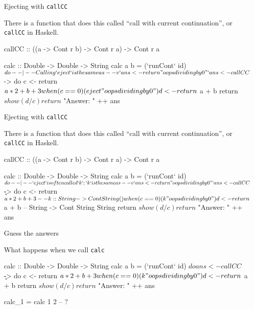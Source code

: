 \documentclass[ignorenonframetext,]{beamer}
\begin{document}
\begin{frame}[fragile]{Ejecting with \texttt{callCC}}

There is a function that does this called ``call with current
continuation'', or \texttt{callCC} in Haskell.

\begin{haskellcode}
callCC :: ((a -> Cont r b) -> Cont r a) -> Cont r a

calc :: Double -> Double -> String
calc a b = (`runCont` id) $ do

  --  |-- Calling `eject` is the same as
  --  v   `ans <- return "oops dividing by 0"`
  ans <- callCC $ \eject -> do
           c <- return $ a*2 + b + 3
           when (c == 0) (eject "oops dividing by 0")
           d <- return $ a + b
           return $ show (d / c)

  return $ "Answer: " ++ ans
\end{haskellcode}

\end{frame}

\begin{frame}[fragile]{Ejecting with \texttt{callCC}}

There is a function that does this called ``call with current
continuation'', or \texttt{callCC} in Haskell.

\begin{haskellcode}
callCC :: ((a -> Cont r b) -> Cont r a) -> Cont r a
\end{haskellcode}

\begin{haskellcode}
calc :: Double -> Double -> String
calc a b = (`runCont` id) $ do

  --  |-- `eject` is often called `k`; `k` is the same as
  --  v   `ans <- return "oops dividing by 0"`
  ans <- callCC $ \k -> do
           c <- return $ a*2 + b + 3
           --             k :: String -> Cont String ()
           when (c == 0) (k "oops dividing by 0")
           d <- return $ a + b
           -- String -> Cont String String
           return $ show (d / c)

  return $ "Answer: " ++ ans
\end{haskellcode}

\end{frame}

\begin{frame}[fragile]{Guess the answers}

What happens when we call \texttt{calc}

\begin{haskellcode}
calc :: Double -> Double -> String
calc a b = (`runCont` id) $ do

  ans <- callCC $ \k -> do
           c <- return $ a*2 + b + 3
           when (c == 0) (k "oops dividing by 0")
           d <- return $ a + b
           return $ show (d / c)

  return $ "Answer: " ++ ans
\end{haskellcode}

\begin{haskellcode}
calc_1 = calc 1 2    -- ?
\end{haskellcode}

\end{frame}
\end{document}
